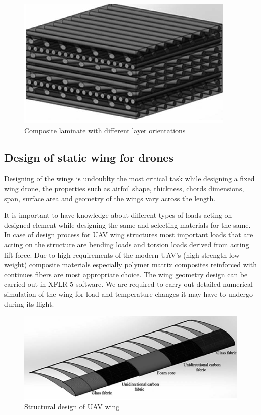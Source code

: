 \documentclass{article}
\begin{document}
\begin{figure}[h!]
\centering
\includegraphics[scale=0.5]{dfm2}
\caption{ Composite laminate with different layer orientations}
\label{fig:universe}
\end{figure}
\subsection{Design of static wing for drones}
Designing of the wings is undoublty the most critical task while designing a fixed wing drone, the properties such as airfoil shape, thickness, chords dimensions, span, surface area and geometry of the wings vary across the length.

It is important to have knowledge about different types of loads acting on designed element while designing the same and selecting materials for the same. In case of design process for UAV wing structures most important loads that are acting on the structure are bending loads and torsion loads derived from acting lift force. Due to high requirements of the modern UAV’s (high strength-low weight) composite materials especially polymer matrix composites reinforced with continues fibers are most appropriate choice. The wing geometry design can be carried out in XFLR 5 software. We are required to carry out detailed numerical simulation of the wing for load and temperature changes it may have to undergo during its flight.

\begin{figure}[h!]
\centering
\includegraphics[scale=0.5]{dfm3}
\caption{ Structural design of UAV wing}
\label{fig:universe}
\end{figure}
\end{document}
